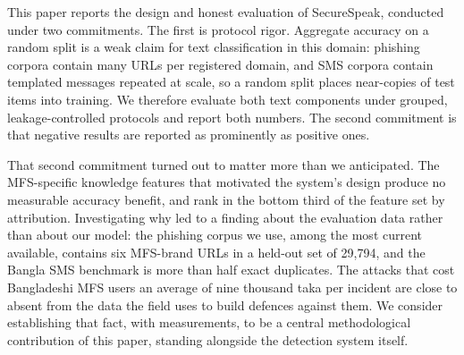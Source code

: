 \documentclass[manuscript,screen,review]{acmart}
\begin{document}
This paper reports the design and honest evaluation of SecureSpeak, conducted under two commitments. The first is protocol rigor. Aggregate accuracy on a random split is a weak claim for text classification in this domain: phishing corpora contain many URLs per registered domain, and SMS corpora contain templated messages repeated at scale, so a random split places near-copies of test items into training. We therefore evaluate both text components under grouped, leakage-controlled protocols and report both numbers. The second commitment is that negative results are reported as prominently as positive ones.

That second commitment turned out to matter more than we anticipated. The MFS-specific knowledge features that motivated the system's design produce no measurable accuracy benefit, and rank in the bottom third of the feature set by attribution. Investigating why led to a finding about the evaluation data rather than about our model: the phishing corpus we use, among the most current available, contains six MFS-brand URLs in a held-out set of 29{,}794, and the Bangla SMS benchmark is more than half exact duplicates. The attacks that cost Bangladeshi MFS users an average of nine thousand taka per incident are close to absent from the data the field uses to build defences against them. We consider establishing that fact, with measurements, to be a central methodological contribution of this paper, standing alongside the detection system itself.
\end{document}
